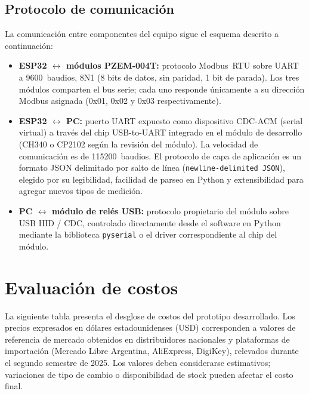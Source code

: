 \subsection{Protocolo de comunicación}
\label{subsec:protocolo_comunicacion}

La comunicación entre componentes del equipo sigue el esquema
descrito a continuación:

\begin{itemize}
    \item \textbf{ESP32 $\leftrightarrow$ módulos PZEM-004T:}
          protocolo Modbus~RTU sobre UART a 9600~baudios, 8N1
          (8 bits de datos, sin paridad, 1 bit de parada).
          Los tres módulos comparten el bus serie;
          cada uno responde únicamente a su dirección Modbus asignada
          (0x01, 0x02 y 0x03 respectivamente).

    \item \textbf{ESP32 $\leftrightarrow$ PC:}
          puerto UART expuesto como dispositivo CDC-ACM (serial virtual)
          a través del chip USB-to-UART integrado en el módulo de desarrollo
          (CH340 o CP2102 según la revisión del módulo).
          La velocidad de comunicación es de 115200~baudios.
          El protocolo de capa de aplicación es un formato JSON
          delimitado por salto de línea (\texttt{newline-delimited JSON}),
          elegido por su legibilidad, facilidad de parseo en Python
          y extensibilidad para agregar nuevos tipos de medición.

    \item \textbf{PC $\leftrightarrow$ módulo de relés USB:}
          protocolo propietario del módulo sobre USB HID / CDC,
          controlado directamente desde el software en Python
          mediante la biblioteca \texttt{pyserial} o el driver
          correspondiente al chip del módulo.
\end{itemize}

\section{Evaluación de costos}
\label{sec:costos}

La siguiente tabla presenta el desglose de costos del prototipo
desarrollado. Los precios expresados en dólares estadounidenses (USD)
corresponden a valores de referencia de mercado obtenidos en
distribuidores nacionales y plataformas de importación
(Mercado Libre Argentina, AliExpress, DigiKey),
relevados durante el segundo semestre de 2025.
Los valores deben considerarse estimativos;
variaciones de tipo de cambio o disponibilidad de stock
pueden afectar el costo final.

